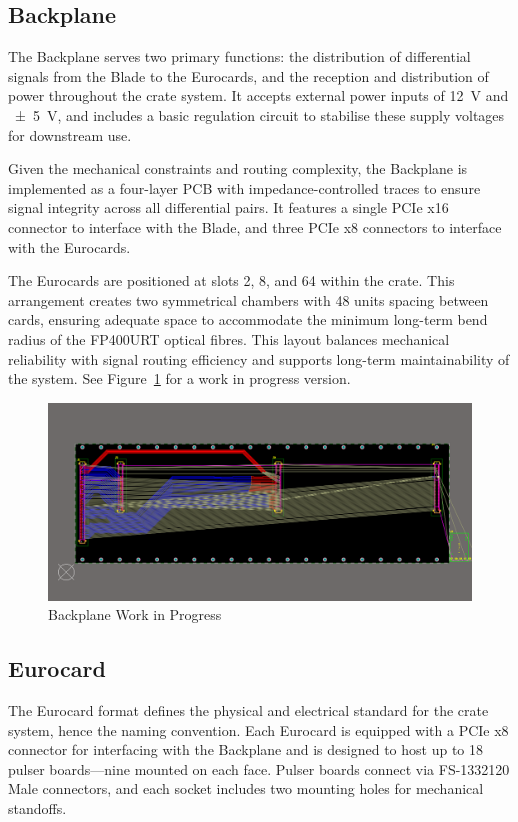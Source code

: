 \documentclass[a4paper,11pt]{article}
\begin{document}
\subsection{Backplane}

The Backplane serves two primary functions: the distribution of differential signals from the Blade to the Eurocards, and the reception and distribution of power throughout the crate system. It accepts external power inputs of \SI{12}{\volt} and \SI{\pm5}{\volt}, and includes a basic regulation circuit to stabilise these supply voltages for downstream use.

Given the mechanical constraints and routing complexity, the Backplane is implemented as a four-layer PCB with impedance-controlled traces to ensure signal integrity across all differential pairs. It features a single PCIe x16 connector to interface with the Blade, and three PCIe x8 connectors to interface with the Eurocards.

The Eurocards are positioned at slots 2, 8, and 64 within the crate. This arrangement creates two symmetrical chambers with  48 units spacing between cards, ensuring adequate space to accommodate the minimum long-term bend radius of the FP400URT optical fibres. This layout balances mechanical reliability with signal routing efficiency and supports long-term maintainability of the system. See Figure~\ref{fig:BackplaneWIP} for a work in progress version.

\begin{figure}[htbp]
\centering
\includegraphics[scale=0.5]{BackplaneWIP.png}
\caption{Backplane Work in Progress\label{fig:BackplaneWIP}}
\end{figure}

\subsection{Eurocard}

The Eurocard format defines the physical and electrical standard for the crate system, hence the naming convention. Each Eurocard is equipped with a PCIe x8 connector for interfacing with the Backplane and is designed to host up to 18 pulser boards—nine mounted on each face. Pulser boards connect via FS-1332120 Male\cite{1332120} connectors, and each socket includes two mounting holes for mechanical standoffs.
\end{document}
